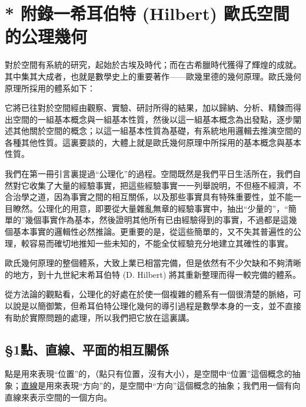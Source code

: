 \section*{* 附錄一\quad 希耳伯特 (Hilbert) 歐氏空間的公理幾何}
\label{sec:b3_a1}

\renewcommand{\thefigure}{附1-\arabic{figure}}
\setcounter{figure}{0}

對於空間有系統的研究，起始於古埃及時代；而在古希臘時代獲得了輝煌的成就。其中集其大成者，也就是數學史上的重要著作——歐幾里德的幾何原理。歐氏幾何原理所採用的體系如下：

它將已往對於空間經由觀察、實驗、研討所得的結果，加以歸納、分析、精鍊而得出空間的一組基本概念與一組基本性質，然後以這一組基本概念為出發點，逐步闡述其他關於空間的概念；以這一組基本性質為基礎，有系統地用邏輯去推演空間的各種其他性質。這裏要談的，大體上就是歐氏幾何原理中所採用的基本概念與基本性質。

我們在第一冊引言裏提過“公理化”的過程。空間既然是我們平日生活所在，我們自然對它收集了大量的經驗事實，把這些經驗事實一一列舉說明，不但極不經濟，不合治學之道，因為事實之間的相互關係，以及那些事實具有特殊重要性，並不能一目瞭然。公理化的用意，即要從大量雜亂無章的經驗事實中，抽出“少量的”，“簡單的”幾個事實作為基本，然後證明其他所有已由經驗得到的事實，不過都是這幾個基本事實的邏輯性必然推論。更重要的是，從這些簡單的，又不失其普遍性的公理，較容易而確切地推知一些未知的，不能全仗經驗充分地建立其確性的事實。

歐氏幾何原理的整個體系，大致上業已相當完備，但是依然有不少欠缺和不夠清晰的地方，到十九世紀末希耳伯特 (D. Hilbert) 將其重新整理而得一較完備的體系。

從方法論的觀點看，公理化的好處在於使一個複雜的體系有一個很清楚的脈絡，可以說是以簡御繁，但希耳伯特公理化幾何的導引過程是數學本身的一支，並不直接有助於實際問題的處理，所以我們把它放在這裏講。

\subsection*{\S 1\quad 點、直線、平面的相互關係}
\label{sec:b3_a1_1}

點是用來表現“位置”的，（點只有位置，沒有大小），是空間中“位置”這個概念的抽象；\underline{直線}是用來表現“方向”的，是空間中“方向”這個概念的抽象；我們用一個有向直線來表示空間的一個方向。

